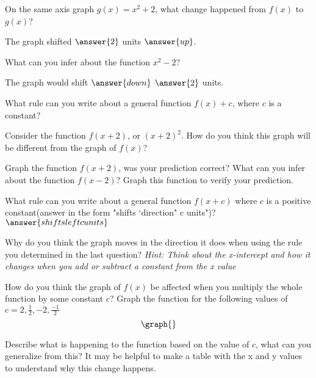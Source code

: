 \documentclass{ximera}
\begin{document}
\begin{question}

On the same axis graph $g(x)=x^2+2$, what change happened from $f(x)$ to $g(x)$?

The graph shifted $\answer{2}$ units $\answer{up}$.

What can you infer about the function $x^2-2$?

The graph would shift $\answer{down}$ $\answer{2}$ units.

What rule can you write about a general function $f(x)+c$, where $c$ is a constant?
\begin{freeResponse}
\end{freeResponse}
Consider the function $f(x+2)$, or $(x+2)^2$. How do you think this graph will be different from the graph of $f(x)$?
\begin{freeResponse}
\end{freeResponse}
Graph the function $f(x+2)$, was your prediction correct? What can you infer about the function $f(x-2)$? Graph this function to verify your prediction.
\begin{freeResponse}
\end{freeResponse}
What rule can you write about a general function $f(x+c)$ where $c$ is a positive constant(answer in the form "shifts `direction" c units")?
$\answer{shifts left c units}$

Why do you think the graph moves in the direction it does when using the rule you determined in the last question? \textit{Hint: Think about the x-intercept and how it changes when you add or subtract a constant from the x value}
\begin{freeResponse}
\end{freeResponse}
How do you think the graph of $f(x)$ be affected when you multiply the whole function by some constant $c$? Graph the function for the following values of $c=2,\frac{1}{2},-2,\frac{-1}{2}$
\[
\graph{}
\]
\begin{freeResponse}
\end{freeResponse}
Describe what is happening to the function based on the value of $c$, what can you generalize from this? It may be helpful to make a table with the x and y values to understand why this change happens.
\begin{freeResponse}
\end{freeResponse}
\end{question}
\end{document}
